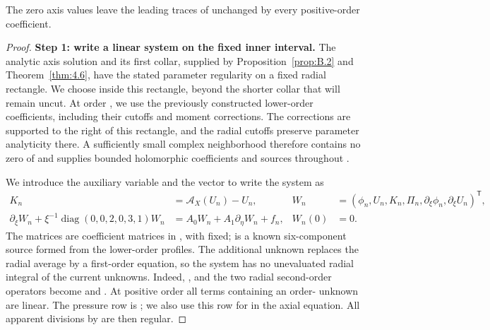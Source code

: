 The zero axis values leave the leading traces of
 unchanged by every positive-order
coefficient.

\begin{proof}
\textbf{Step 1: write a linear system on the fixed inner interval.} The analytic
axis solution and its first collar, supplied by Proposition~\ref{prop:B.2} and
Theorem~\ref{thm:4.6}, have the stated parameter regularity on a fixed radial
rectangle. We choose  inside this rectangle, beyond the
shorter collar that will remain uncut. At order , we use
the previously constructed lower-order coefficients, including their cutoffs
and moment corrections. The corrections are supported to the right of this
rectangle, and the radial cutoffs preserve parameter analyticity there. A
sufficiently small complex neighborhood
 therefore contains no zero of
 and supplies bounded holomorphic coefficients and
sources throughout .

We introduce the auxiliary variable  and the vector
 to write the system as
\begin{equation}
\label{eq:5.7}
\begin{aligned}
K_n&=\mathcal A_X(U_n)-U_n,
&W_n&=(\phi_n,U_n,K_n,\Pi_n,\partial_\xi\phi_n,\partial_\xi U_n)^{\mathsf T},\\
\partial_\xi W_n+\xi^{-1}\operatorname{diag}(0,0,2,0,3,1)W_n
&=A_0W_n+A_1\partial_\eta W_n+f_n,
&W_n(0)&=0.
\end{aligned}
\tag{5.7}
\end{equation}
%
The matrices  are
 coefficient matrices in
, with  fixed;
 is a known six-component source formed from the
lower-order profiles. The additional unknown 
replaces the radial average by a first-order equation, so the system has no
unevaluated radial integral of the current unknowns. Indeed,
, and the two
radial second-order operators become
 and
. At positive
order all terms containing an order- unknown are linear.
The pressure row is
; we also use this row for
 in the axial equation. All apparent
divisions by  are then regular.


\end{proof}
